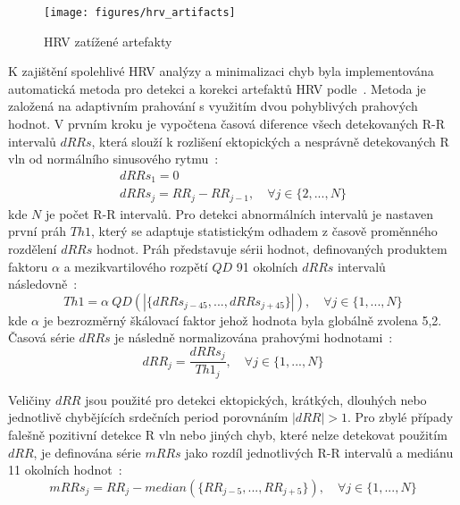 \begin{figure}[h]
    \begin{center}
        \texttt{[image: figures/hrv\_artifacts]}
        \caption{HRV zatížené artefakty}
        \label{fig:hrv_artifacts}
    \end{center}
\end{figure}

K zajištění spolehlivé HRV analýzy a minimalizaci chyb byla implementována
automatická metoda pro detekci a korekci artefaktů HRV
podle~\cite{Lipponen2019}. Metoda je založená na adaptivním prahování s využitím
dvou pohyblivých prahových hodnot. V prvním kroku je vypočtena časová diference
všech detekovaných R-R intervalů $dRRs$, která slouží k rozlišení ektopických a
nesprávně detekovaných R vln od normálního sinusového rytmu~\cite{Lipponen2019}:
\begin{gather}
    dRRs_1 = 0 \nonumber \\
    dRRs_j = RR_j - RR_{j-1}, \quad \forall j \in \{2,...,N\}
\end{gather}
kde $N$ je počet R-R intervalů. Pro detekci abnormálních intervalů je nastaven
první práh $Th1$, který se adaptuje statistickým odhadem z časově proměnného
rozdělení $dRRs$ hodnot. Práh představuje sérii hodnot, definovaných produktem
faktoru $\alpha$ a mezikvartilového rozpětí $QD$ 91 okolních $dRRs$ intervalů
následovně~\cite{Lipponen2019}:
\begin{equation}
    Th1 = \alpha~QD(|\{dRRs_{j-45},...,dRRs_{j+45}\}|), \quad \forall j \in \{1,...,N\}
\end{equation}
kde $\alpha$ je bezrozměrný škálovací faktor jehož hodnota byla globálně zvolena
5,2. Časová série $dRRs$ je následně normalizována prahovými
hodnotami~\cite{Lipponen2019}:
\begin{equation}
    dRR_j = \frac{dRRs_j}{Th1_j}, \quad \forall j \in \{1,...,N\}
\end{equation}

Veličiny $dRR$ jsou použité pro detekci ektopických, krátkých, dlouhých nebo
jednotlivě chybějících srdečních period porovnáním $|dRR|>1$. Pro zbylé případy
falešně pozitivní detekce R vln nebo jiných chyb, které nelze detekovat použitím
$dRR$, je definována série $mRRs$ jako rozdíl jednotlivých R-R intervalů a
mediánu 11 okolních hodnot~\cite{Lipponen2019}:
\begin{equation}
    mRRs_j = RR_j - median(\{RR_{j-5},...,RR_{j+5}\}), \quad \forall j \in \{1,...,N\}
\end{equation}

